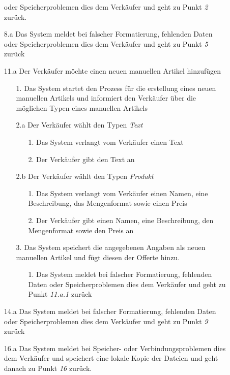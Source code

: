 \documentclass[a4paper,12pt]{article}
\begin{document}
\begin{description}
\begin{enumerate}
			oder Speicherproblemen dies dem Verkäufer und geht zu Punkt \emph{2} zurück.
			\item [8.a] Das System meldet bei falscher Formatierung, fehlenden Daten
			oder Speicherproblemen dies dem Verkäufer und geht zu Punkt \emph{5} zurück
			\item [11.a] Der Verkäufer möchte einen neuen manuellen Artikel hinzufügen
			\begin{enumerate}
				\item[1.] Das System startet den Prozess für die erstellung eines neuen manuellen Artikels
				und informiert den Verkäufer über die möglichen Typen eines manuellen Artikels
				\item[2.a] Der Verkäufer wählt den Typen \emph{Text}
				\begin{enumerate}
					\item[1.] Das System verlangt vom Verkäufer einen Text
					\item[2.] Der Verkäufer gibt den Text an
				\end{enumerate}
				\item[2.b] Der Verkäufer wählt den Typen \emph{Produkt}
				\begin{enumerate}
					\item[1.] Das System verlangt vom Verkäufer einen Namen, eine Beschreibung,
					das Mengenformat sowie einen Preis
					\item[2.] Der Verkäufer gibt einen Namen, eine Beschreibung, den Mengenformat
					sowie den Preis an
				\end{enumerate} 
				\item[3.] Das System speichert die angegebenen Angaben als neuen manuellen Artikel
				und fügt diesen der Offerte hinzu.
				\begin{enumerate}
					\item [1.] Das System meldet bei falscher Formatierung, fehlenden Daten
					oder Speicherproblemen dies dem Verkäufer und geht zu Punkt \emph{11.a.1} zurück
				\end{enumerate} 
			\end{enumerate}
			\item [14.a] Das System meldet bei falscher Formatierung, fehlenden Daten
			oder Speicherproblemen dies dem Verkäufer und geht zu Punkt \emph{9} zurück
			\item [16.a] Das System meldet bei Speicher-  oder Verbindungsproblemen
			dies dem Verkäufer und speichert eine lokale Kopie der Dateien und geht danach
			zu Punkt \emph{16} zurück.
		\end{enumerate}
	\end{description}
	
\end{document}

